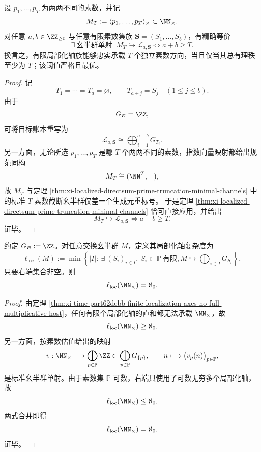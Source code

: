 \begin{theorem}[有限素数支撑自由乘法子幺半群的最小局部化轴阈值恰等于生成素数个数]\label{thm:xi-time-part62debb-finite-prime-support-localized-axis-threshold}
设 \(p_1,\dots,p_T\) 为两两不同的素数，并记
\[
M_T:=\langle p_1,\dots,p_T\rangle_{\times}\subset \NN_{\times}.
\]
对任意 \(a,b\in \ZZ_{\ge 0}\) 与任意有限素数集族 \(\mathbf S=(S_1,\dots,S_b)\)，有精确等价
\[
\exists\ \text{幺半群单射 }\ 
M_T\hookrightarrow \mathcal L_{a,\mathbf S}
\iff
a+b\ge T.
\]
换言之，有限局部化轴族能够忠实承载 \(T\) 个独立素数方向，当且仅当其总有理秩至少为 \(T\)；该阈值严格且最优。
\end{theorem}
\begin{proof}
记
\[
T_1=\cdots=T_a=\varnothing,
\qquad
T_{a+j}=S_j\quad (1\le j\le b).
\]
由于
\[
G_{\varnothing}=\ZZ,
\]
可将目标账本重写为
\[
\mathcal L_{a,\mathbf S}
\cong
\bigoplus_{i=1}^{a+b}G_{T_i}.
\]
另一方面，无论所选 \(p_1,\dots,p_T\) 是哪 \(T\) 个两两不同的素数，指数向量映射都给出规范同构
\[
M_T\cong (\NN^T,+),
\]
故 \(M_T\) 与定理
\ref{thm:xi-localized-directsum-prime-truncation-minimal-channels}
中的标准 \(T\)-素数截断幺半群仅差一个生成元重标号。
于是定理 \ref{thm:xi-localized-directsum-prime-truncation-minimal-channels}
恰可直接应用，并给出
\[
M_T\hookrightarrow \mathcal L_{a,\mathbf S}
\iff
a+b\ge T.
\]
证毕。
\end{proof}

\begin{corollary}\label{cor:xi-time-part62debb-full-multiplicative-localized-axis-complexity}
约定 \(G_{\varnothing}:=\ZZ\)。对任意交换幺半群 \(M\)，定义其局部化轴复杂度为
\[
\ell_{\mathrm{loc}}(M)
:=
\min\left\{
|I|:\ \exists\ (S_i)_{i\in I},\ S_i\subset \mathbb P\ \text{有限},
M\hookrightarrow \bigoplus_{i\in I}G_{S_i}
\right\},
\]
只要右端集合非空。则
\[
\ell_{\mathrm{loc}}(\NN_{\times})=\aleph_0.
\]
\end{corollary}
\begin{proof}
由定理 \ref{thm:xi-time-part62debb-finite-localization-axes-no-full-multiplicative-host}，任何有限个局部化轴的直和都无法承载 \(\NN_{\times}\)，故
\[
\ell_{\mathrm{loc}}(\NN_{\times})\ge \aleph_0.
\]
另一方面，按素数估值给出的映射
\[
v:\NN_{\times}\longrightarrow \bigoplus_{p\in\mathbb P}\ZZ
\subset
\bigoplus_{p\in\mathbb P}G_{\{p\}},
\qquad
n\longmapsto \bigl(v_p(n)\bigr)_{p\in\mathbb P},
\]
是标准幺半群单射。由于素数集 \(\mathbb P\) 可数，右端只使用了可数无穷多个局部化轴，故
\[
\ell_{\mathrm{loc}}(\NN_{\times})\le \aleph_0.
\]
两式合并即得
\[
\ell_{\mathrm{loc}}(\NN_{\times})=\aleph_0.
\]
证毕。
\end{proof}

